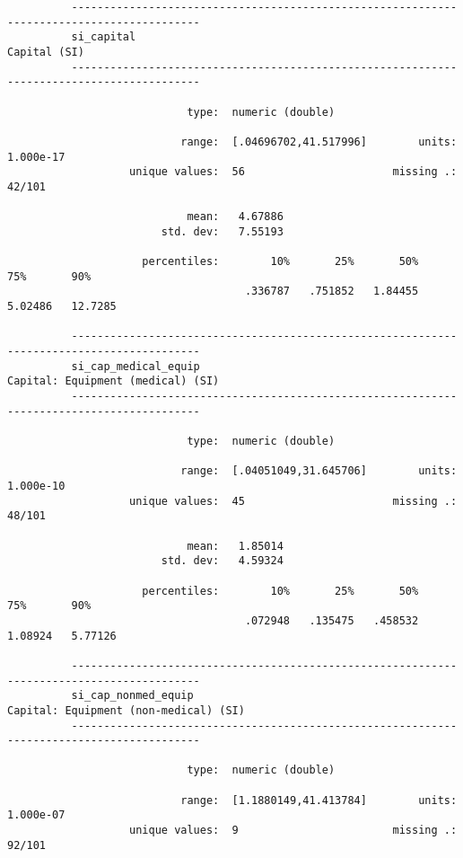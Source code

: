 \documentclass{article}
\begin{document}
\begin{verbatim}
          ------------------------------------------------------------------------------------------
          si_capital                                                                    Capital (SI)
          ------------------------------------------------------------------------------------------
          
                            type:  numeric (double)
          
                           range:  [.04696702,41.517996]        units:  1.000e-17
                   unique values:  56                       missing .:  42/101
          
                            mean:   4.67886
                        std. dev:   7.55193
          
                     percentiles:        10%       25%       50%       75%       90%
                                     .336787   .751852   1.84455   5.02486   12.7285
          
          ------------------------------------------------------------------------------------------
          si_cap_medical_equip                                     Capital: Equipment (medical) (SI)
          ------------------------------------------------------------------------------------------
          
                            type:  numeric (double)
          
                           range:  [.04051049,31.645706]        units:  1.000e-10
                   unique values:  45                       missing .:  48/101
          
                            mean:   1.85014
                        std. dev:   4.59324
          
                     percentiles:        10%       25%       50%       75%       90%
                                     .072948   .135475   .458532   1.08924   5.77126
          
          ------------------------------------------------------------------------------------------
          si_cap_nonmed_equip                                  Capital: Equipment (non-medical) (SI)
          ------------------------------------------------------------------------------------------
          
                            type:  numeric (double)
          
                           range:  [1.1880149,41.413784]        units:  1.000e-07
                   unique values:  9                        missing .:  92/101
          

\end{verbatim}
\end{document}
